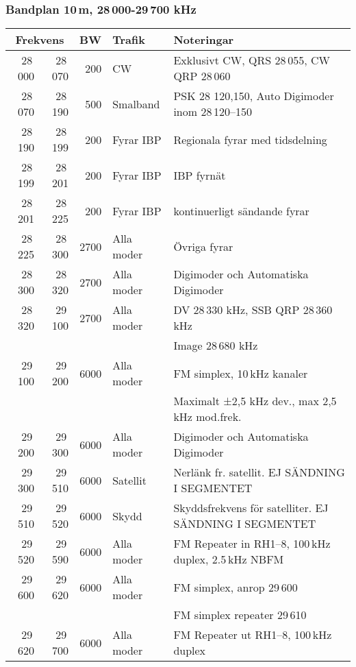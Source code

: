 \small
\subsubsection{Bandplan 10\,m, 28\,000-29\,700 kHz}
\begin{tabular}{rrrll}
\multicolumn{2}{c}{\textbf{Frekvens}} & \textbf{BW} & \textbf{Trafik} & \textbf{Noteringar} \\ \hline
28\,000 & 28\,070 & 200  & CW         & Exklusivt CW, QRS 28\,055, CW QRP 28\,060              \\ \hline
28\,070 & 28\,190 & 500  & Smalband   & PSK 28 120,150, Auto Digimoder inom 28\,120--150       \\ \hline
28\,190 & 28\,199 & 200  & Fyrar IBP  & Regionala fyrar med tidsdelning                        \\ \hline
28\,199 & 28\,201 & 200  & Fyrar IBP  & IBP fyrnät                                             \\ \hline
28\,201 & 28\,225 & 200  & Fyrar IBP  & kontinuerligt sändande fyrar                           \\ \hline
28\,225 & 28\,300 & 2700 & Alla moder & Övriga fyrar                                           \\ \hline
28\,300 & 28\,320 & 2700 & Alla moder & Digimoder och Automatiska Digimoder                    \\ \hline
28\,320 & 29\,100 & 2700 & Alla moder & DV 28\,330 kHz, SSB QRP 28\,360 kHz                    \\
        &         &      &            & Image 28\,680 kHz                                      \\ \hline
29\,100 & 29\,200 & 6000 & Alla moder & FM simplex, 10\,kHz kanaler                            \\
        &         &      &            & Maximalt ±2,5 kHz dev., max 2,5\,kHz mod.frek.         \\ \hline
29\,200 & 29\,300 & 6000 & Alla moder & Digimoder och Automatiska Digimoder                    \\ \hline
29\,300 & 29\,510 & 6000 & Satellit   & Nerlänk fr. satellit. EJ SÄNDNING I SEGMENTET          \\ \hline
29\,510 & 29\,520 & 6000 & Skydd      & Skyddsfrekvens för satelliter. EJ SÄNDNING I SEGMENTET \\ \hline
29\,520 & 29\,590 & 6000 & Alla moder & FM Repeater in RH1--8, 100\,kHz duplex, 2.5\,kHz NBFM  \\ \hline
29\,600 & 29\,620 & 6000 & Alla moder & FM simplex, anrop 29\,600                              \\
        &         &      &            & FM simplex repeater 29\,610                            \\ \hline
29\,620 & 29\,700 & 6000 & Alla moder & FM Repeater ut RH1--8, 100\,kHz duplex                 \\ \hline
\end{tabular}
\normalsize

